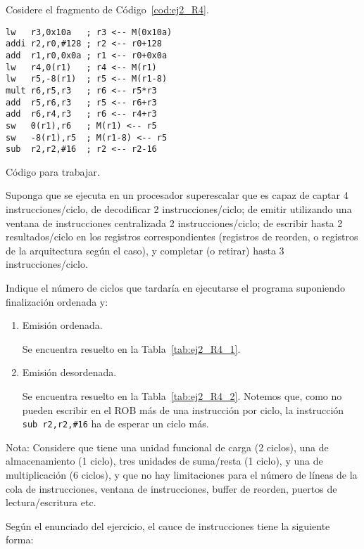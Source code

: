 \begin{ejercicio}  \label{ej:2_R4}
    Cosidere el fragmento de Código~\ref{cod:ej2_R4}.
    \begin{listing}[H]
    \begin{verbatim}
lw   r3,0x10a   ; r3 <-- M(0x10a)
addi r2,r0,#128 ; r2 <-- r0+128
add  r1,r0,0x0a ; r1 <-- r0+0x0a
lw   r4,0(r1)   ; r4 <-- M(r1)
lw   r5,-8(r1)  ; r5 <-- M(r1-8)
mult r6,r5,r3   ; r6 <-- r5*r3
add  r5,r6,r3   ; r5 <-- r6+r3
add  r6,r4,r3   ; r6 <-- r4+r3
sw   0(r1),r6   ; M(r1) <-- r5
sw   -8(r1),r5  ; M(r1-8) <-- r5
sub  r2,r2,#16  ; r2 <-- r2-16
    \end{verbatim}
    \caption{Código para trabajar.}
    \label{cod:ej2_R4}
    \end{listing}
Suponga que se ejecuta en un procesador superescalar que es capaz de captar 4 instrucciones/ciclo, de decodificar 2 instrucciones/ciclo; de emitir utilizando una ventana de instrucciones centralizada 2 instrucciones/ciclo; de escribir hasta 2 resultados/ciclo en los registros correspondientes (registros de reorden, o registros de la arquitectura según el caso), y completar (o retirar) hasta 3 instrucciones/ciclo.

Indique el número de ciclos que tardaría en ejecutarse el programa suponiendo finalización ordenada y:
\begin{enumerate}
    \item Emisión ordenada.
    
    Se encuentra resuelto en la Tabla~\ref{tab:ej2_R4_1}.
    \item Emisión desordenada.
    
    Se encuentra resuelto en la Tabla~\ref{tab:ej2_R4_2}. Notemos que, como
    no pueden escribir en el ROB más de una instrucción por ciclo,
    la instrucción \verb|sub r2,r2,#16| ha de esperar un ciclo más.
\end{enumerate}
Nota: Considere que tiene una unidad funcional de carga (2 ciclos), una de almacenamiento (1 ciclo), tres unidades de suma/resta (1 ciclo), y una de multiplicación (6 ciclos), y que no hay limitaciones para el número de líneas de la cola de instrucciones, ventana de instrucciones, buffer de reorden, puertos de lectura/escritura etc.


Según el enunciado del ejercicio, el cauce de instrucciones tiene la siguiente forma:
\begin{figure}[H]
\centering
{}
\end{figure}
\end{ejercicio}
